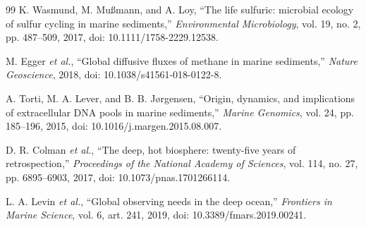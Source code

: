 \documentclass[conference]{../../../../Conference-LaTeX-template_10-17-19/IEEEtran}
\begin{document}
\begin{thebibliography}{99}
K. Wasmund, M. Mu{\ss}mann, and A. Loy, ``The life sulfuric: microbial ecology of sulfur cycling in marine sediments,'' \textit{Environmental Microbiology}, vol. 19, no. 2, pp. 487--509, 2017, doi: 10.1111/1758-2229.12538.

M. Egger \textit{et al.}, ``Global diffusive fluxes of methane in marine sediments,'' \textit{Nature Geoscience}, 2018, doi: 10.1038/s41561-018-0122-8.

A. Torti, M. A. Lever, and B. B. J\o{}rgensen, ``Origin, dynamics, and implications of extracellular DNA pools in marine sediments,'' \textit{Marine Genomics}, vol. 24, pp. 185--196, 2015, doi: 10.1016/j.margen.2015.08.007.

D. R. Colman \textit{et al.}, ``The deep, hot biosphere: twenty-five years of retrospection,'' \textit{Proceedings of the National Academy of Sciences}, vol. 114, no. 27, pp. 6895--6903, 2017, doi: 10.1073/pnas.1701266114.

L. A. Levin \textit{et al.}, ``Global observing needs in the deep ocean,'' \textit{Frontiers in Marine Science}, vol. 6, art. 241, 2019, doi: 10.3389/fmars.2019.00241.
\end{thebibliography}
\end{document}
